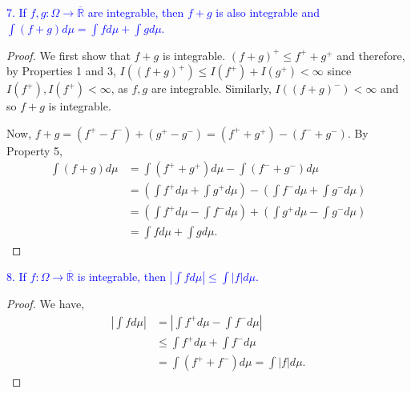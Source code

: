 \documentclass[12pt]{extarticle}
\newcommand{\R}{\overline{\mathbb{R}}}
\begin{document}
\textcolor{blue}{7. If $f, g: \Omega \to \R$ are integrable, then $f + g$ is also integrable and $\int (f + g) d\mu = \int fd\mu + \int gd\mu$.}
\begin{proof}
    We first show that $f + g$ is integrable. $(f + g)^+ \leq f^+ + g^+$ and therefore, by Properties 1 and 3, $I((f + g)^+) \leq I(f^+) + I(g^+)< \infty$ since $I(f^+), I(f^+) < \infty$, as $f, g$ are integrable. Similarly, $I((f + g)^-) < \infty$ and so $f + g$ is integrable.

    Now, $f + g = (f^+ - f^-) + (g^+ - g^-) = (f^+ + g^+) - (f^- + g^-)$. By Property 5,
    \begin{align*}
        \int(f + g) d\mu &= \int (f^+ + g^+)d\mu - \int(f^- + g^-)d\mu \\
        &= \left( \int f^+ d\mu + \int g^+ d\mu \right) - \left( \int f^- d\mu + \int g^- d\mu \right) \tag{by Property 3}\\
        &= \left( \int f^+ d \mu - \int f^- d \mu\right) + \left( \int g^+ d \mu - \int g^- d \mu\right) \\
        &= \int fd\mu + \int gd\mu.
    \end{align*}
\end{proof}

\textcolor{blue}{8. If $f: \Omega \to \R$ is integrable, then $|\int fd\mu| \leq \int|f| d\mu$.}
\begin{proof}
    We have,
    \begin{align*}
    \left|\int f d\mu\right| &= \left|\int f^+ d\mu - \int f^-d\mu\right| \\
    &\leq \int f^+ d\mu + \int f^-d\mu \\
    &= \int(f^+ + f^-) d\mu = \int |f| d\mu.
    \end{align*}    
\end{proof}
\end{document}
